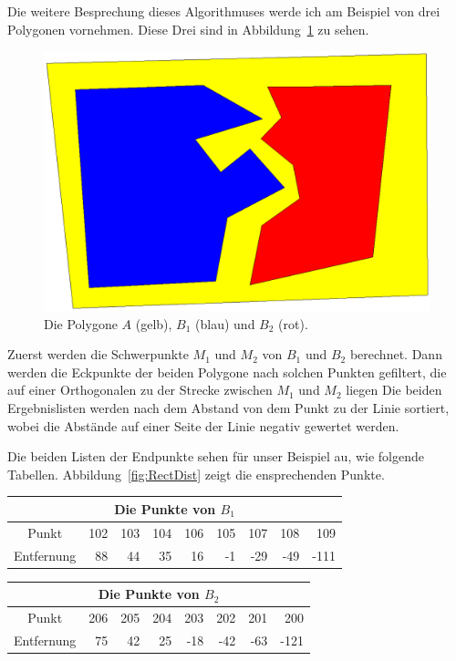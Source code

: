 Die weitere Besprechung dieses Algorithmuses werde ich am Beispiel von drei Polygonen vornehmen. Diese Drei sind in Abbildung~\ref{fig:ZuZersplitten} zu sehen.

\begin{figure}
	\centering
	\includegraphics[scale=0.6]{ZuZersplitten.eps}
	\caption[Zu teilendes Polygon mit Referenzpolygonen]{Die Polygone $A$ (gelb), $B_1$ (blau) und $B_2$ (rot).}
	\label{fig:ZuZersplitten}
\end{figure}

Zuerst werden die Schwerpunkte $M_1$ und $M_2$  von $B_1$ und $B_2$ berechnet. Dann werden die Eckpunkte der beiden Polygone nach solchen Punkten gefiltert, die auf einer Orthogonalen zu der Strecke zwischen $M_1$ und $M_2$ liegen Die beiden Ergebnislisten werden nach dem Abstand von dem Punkt zu der Linie sortiert, wobei die Abstände auf einer Seite der Linie negativ gewertet werden.

Die beiden Listen der Endpunkte sehen für unser Beispiel au, wie folgende Tabellen. Abbildung~\ref{fig:RectDist} zeigt die ensprechenden Punkte.

\begin{tabular}{|c|r|r|r|r|r|r|r|r|}

\multicolumn{9}{c}{Die Punkte von $B_1$} \\
\hline
Punkt&
 102&
 103&
 104&
 106&
 105&
 107&
 108&
 109\\
\hline
Entfernung&
   88&
   44&
   35&
   16&
   -1&
  -29&
  -49&
 -111\\
\hline
\end{tabular} 

\begin{tabular}{|c|r|r|r|r|r|r|r|}


\multicolumn{8}{c}{Die Punkte von $B_2$} \\
\hline
Punkt&
 206&
 205&
 204&
 203&
 202&
 201&
 200
\\
\hline
Entfernung&
   75&
   42&
   25&
  -18&
  -42&
  -63&
 -121
\\
\hline
\end{tabular} 



